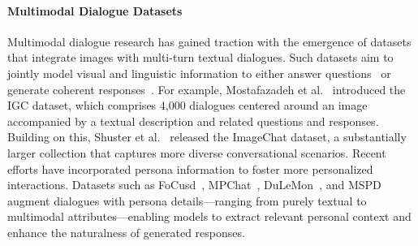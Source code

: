 \paragraph{Multimodal Dialogue Datasets}
Multimodal dialogue research has gained traction with the emergence of datasets that integrate images with multi-turn textual dialogues. Such datasets aim to jointly model visual and linguistic information to either answer questions~\cite{antol2015vqa,das2017visual,seo2017visual,kottur2019clevr,li2023stablellava} or generate coherent responses~\cite{meng2020openvidial,zheng2021mmchat,wang2021openvidial,zang2021photochat,feng2022mmdialog}. For example, Mostafazadeh et al.~\cite{mostafazadeh2017image} introduced the IGC dataset, which comprises 4,000 dialogues centered around an image accompanied by a textual description and related questions and responses. Building on this, Shuster et al.~\cite{shuster2018image} released the ImageChat dataset, a substantially larger collection that captures more diverse conversational scenarios.
Recent efforts have incorporated persona information to foster more personalized interactions. Datasets such as FoCusd~\cite{jang2022call}, MPChat~\cite{ahn2023mpchat}, DuLeMon~\cite{xu2022long}, and MSPD~\cite{kwon2023and} augment dialogues with persona details—ranging from purely textual to multimodal attributes—enabling models to extract relevant personal context and enhance the naturalness of generated responses.




